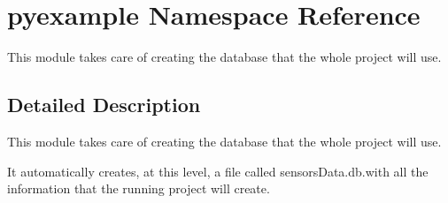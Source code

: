 \hypertarget{namespacepyexample}{}\section{pyexample Namespace Reference}
\label{namespacepyexample}


This module takes care of creating the database that the whole project will use.  




\subsection{Detailed Description}
This module takes care of creating the database that the whole project will use. 

It automatically creates, at this level, a file called sensors\+Data.\+db.\+with all the information that the running project will create. 